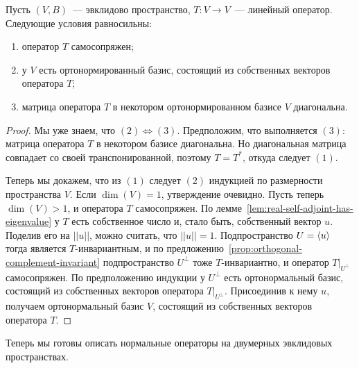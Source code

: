 \begin{theorem}\label{thm:spectral-real-self-adjoint}
Пусть $(V,B)$~--- эвклидово пространство,
$T\colon V\to V$~--- линейный оператор.
Следующие условия равносильны:
\begin{enumerate}
\item оператор $T$ самосопряжен;
\item у $V$ есть ортонормированный базис, состоящий из собственных
векторов оператора $T$;
\item матрица оператора $T$ в некотором ортонормированном базисе
$V$ диагональна.
\end{enumerate}
\end{theorem}
\begin{proof}
Мы уже знаем, что $(2)\Leftrightarrow (3)$. Предположим, что
выполняется $(3)$: матрица оператора $T$ в некотором базисе
диагональна. Но диагональная матрица совпадает со своей
транспонированной, поэтому $T=T^*$, откуда следует $(1)$.

Теперь мы докажем, что из $(1)$ следует $(2)$ индукцией по размерности
пространства $V$.
Если $\dim(V)=1$, утверждение очевидно.
Пусть теперь $\dim(V) > 1$, и оператора $T$ самосопряжен.
По лемме~\ref{lem:real-self-adjoint-has-eigenvalue} у $T$ есть
собственное число и, стало быть, собственный вектор $u$.
Поделив его на $||u||$, можно считать, что $||u|| = 1$.
Подпространство $U = \langle u\rangle$ тогда является $T$-инвариантным, и по
предложению~\ref{prop:orthogonal-complement-invariant}
подпространство $U^\perp$ тоже $T$-инвариантно,
и оператор $T|_{U^\perp}$ самосопряжен.
По предположению индукции у $U^\perp$ есть ортонормальный базис,
состоящий из собственных векторов оператора $T|_{U^\perp}$.
Присоединив к нему $u$, получаем ортонормальный базис $V$,
состоящий из собственных векторов оператора $T$.
\end{proof}

Теперь мы готовы описать нормальные операторы на двумерных эвклидовых
пространствах.

